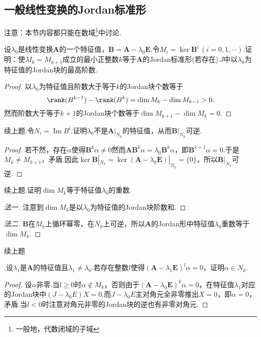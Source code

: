 \subsection{一般线性变换的Jordan标准形}
{\color{blue}注意}：本节内容都只能在数域\footnote{一般地，代数闭域的子域}中讨论.
\begin{prob}[1]
	设$\lambda_0$是线性变换$\bm A$的一个特征值，$\bm B=\bm A-\lambda_0\bm E$.令$M_i=\ker\bm B^i\,(i=0,1,\cdots)$.证明：使$M_k=M_{k+1}$成立的最小正整数$k$等于$\bm A$的Jordan标准形(若存在)$\,J$中以$\lambda_0$为特征值的Jordan块的最高阶数.
\end{prob}
\begin{proof}
	以$\lambda_0$为特征值且阶数大于等于$k$的Jordan块个数等于
	\[
		\rank(B^{k-1})-\rank(B^k)=\dim M_k-\dim M_{k-1}>0.
	\]
	然而阶数大于等于$k+1$的Jordan块个数等于$\dim M_{k+1}-\dim M_k=0$.
\end{proof}
\begin{prob}[2]
	续上题.令$N_i=\operatorname*{Im} B^i$.证明$\lambda_0$不是$\bm A|_{N_k}$的特征值，从而$\bm B|_{N_k}$可逆.
\end{prob}
\begin{proof}
	若不然，存在$\alpha$使得$\bm B^k\alpha\ne 0$然而$\bm A\bm B^k\alpha=\lambda_0\bm B^k\alpha$，即$\bm B^{k+1}\alpha=0$.于是$M_k\ne M_{k+1}$，矛盾.因此$\ker\bm B|_{N_k}=\ker(\bm A-\lambda_0\bm E)|_{N_k}=\{0\}$，所以$\bm B|_{N_k}$可逆.
\end{proof}
\begin{prob}[3]
	续上题.证明$\dim M_k$等于特征值$\lambda_0$的重数.
\end{prob}
\begin{proof}[法一]
	注意到$\dim M_k$是以$\lambda_0$为特征值的Jordan块阶数和.
\end{proof}
\begin{proof}[法二]
	$\bm B$在$M_k$上循环幂零，在$N_k$上可逆，所以$\bm A$的Jordan形中特征值$\lambda_0$重数等于$\dim M_k$.
\end{proof}
\begin{prob}[4]
	\hypertarget{Tempdajdslka}{续上题}.设$\lambda_1$是$\bm A$的特征值且$\lambda_1\ne\lambda_0$.若存在整数$l$使得$(\bm A-\lambda_1\bm E)^l\alpha=0$，证明$\alpha\in N_k$.
\end{prob}
\begin{proof}
	设$\alpha$非零.当$l\ge 0$时$\alpha\notin M_k$，否则由于$(\bm A-\lambda_0\bm E)^k\alpha=0$，在特征值$\lambda_1$对应的Jordan块中$(J-\lambda_0E)X=0$.而$J-\lambda_0E$主对角元全非零推出$X=0$，即$\alpha=0$，矛盾.当$l<0$时注意对角元非零的Jordan块的逆也有非零对角元.
\end{proof}
